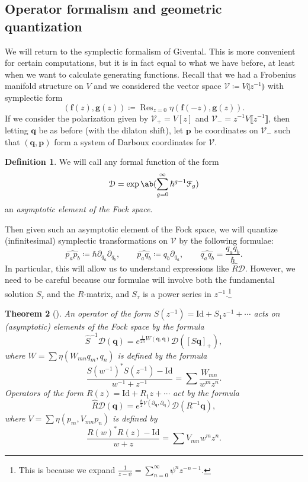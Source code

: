 \documentclass[10pt,oldfontcommands,oneside]{memoir}
\newtheorem{thm}{Theorem}[section]
\theoremstyle{definition}
\newtheorem{defn}[thm]{Definition}
\theoremstyle{remark}
\theoremstyle{plain}
\theoremstyle{definition}
\theoremstyle{remark}
\newcommand{\mc}[1]{\mathcal{#1}}
\newcommand{\mbf}[1]{\mathbf{#1}}
\newcommand{\bq}{\mbf{q}}
\newcommand{\bp}{\mbf{p}}
\newcommand{\mr}[1]{\mathrm{#1}}
\newcommand{\on}[1]{\operatorname{#1}}
\newcommand{\wh}[1]{\widehat{#1}}
\newcommand{\1}{\mathbf{1}}
\newcommand{\2}{\mathbf{2}}
\newcommand{\3}{\mathbf{3}}
\newcommand{\ps}[1]{\llbracket #1 \rrbracket}
\newcommand{\ls}[1]{\llparenthesis #1 \rrparenthesis}
\begin{document}
\subsection{Operator formalism and geometric quantization}%
\label{sub:Operator formalism and geometric quantization}

We will return to the symplectic formalism of Givental. This is more convenient for certain computations, but it is in fact equal to what we have before, at least when we want to calculate generating functions. Recall that we had a Frobenius manifold structure on $V$ and we considered the vector space $\mc{V}\coloneqq V\ls{z^{-1}}$ with symplectic form
\[ (\mbf{f}(z), \mbf{g}(z)) \coloneqq \on{Res}_{z=0} \eta(\mbf{f}(-z), \mbf{g}(z)). \]
If we consider the polarization given by $\mc{V}_+ = V[z]$ and $\mc{V}_- = z^{-1}V\ps{z^{-1}}$, then letting $\bq$ be as before (with the dilaton shift), let $\bp$ be coordinates on $\mc{V}_-$ such that $(\bq, \bp)$ form a system of Darboux coordinates for $\mc{V}$.

\begin{defn}
    We will call any formal function of the form
    \[ \mc{D} = \exp\ab(\sum_{g=0}^{\infty} \hbar^{g-1} \mc{F}_g) \]
    an \textit{asymptotic element of the Fock space}.
\end{defn}

Then given such an asymptotic element of the Fock space, we will quantize (infinitesimal) symplectic transformations on $\mc{V}$ by the following formulae:
\[ \wh{p_a p_b} \coloneqq \hbar \partial_{q_a} \partial_{q_b}, \qquad \wh{p_a q_b} \coloneqq q_b \partial_{q_a}, \qquad \wh{q_a q_b} = \frac{q_a q_b}{\hbar}. \]
In particular, this will allow us to understand expressions like $\hat{R} \mc{D}$. However, we need to be careful because our formulae will involve both the fundamental solution $S_{\tau}$ and the $R$-matrix, and $S_{\tau}$ is a power series in $z^{-1}$.\footnote{This is because we expand $\frac{1}{z-\psi} = \sum_{n=0}^{\infty} \psi^n z^{-n-1}$.}

\begin{thm}[{\cite{virasorofanotoric}}]
    An operator of the form $S(z^{-1}) = \mr{Id} + S_1 z^{-1} + \cdots$ acts on (asymptotic) elements of the Fock space by the formula
    \[ \hat{S}^{-1} \mc{D}(\bq) = e^{\frac{1}{2\hbar}W(\bq,\bq)} \mc{D}([S \bq]_+), \]
    where $W = \sum \eta(W_{mn}q_m, q_n)$ is defined by the formula
    \[ \frac{S(w^{-1})^* S(z^{-1}) - \mr{Id}}{w^{-1}+z^{-1}} = \sum \frac{W_{mn}}{w^m z^n}. \]
    Operators of the form $R(z) = \mr{Id} + R_1 z + \cdots$ act by the formula
    \[ \hat{R}\mc{D}(\bq) = e^{\frac{\hbar}{2} V(\partial_{\bq}, \partial_{\bq})} \mc{D}(R^{-1} \bq), \]
    where $V = \sum \eta(p_m, V_{mn} p_n)$ is defined by 
    \[ \frac{R(w)^* R(z) - \mr{Id}}{w+z} = \sum V_{mn} w^m z^n. \]
\end{thm}
\end{document}
